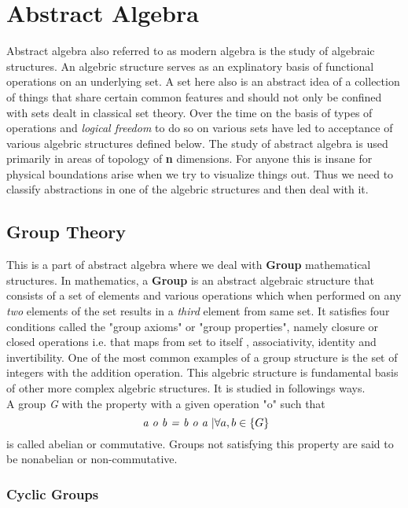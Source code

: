\chapter{Abstract Algebra }

Abstract algebra \cite{abstractmaths} also referred to as modern algebra is the study of algebraic structures. An algebric structure serves as an explinatory basis of functional operations on an underlying set. A set here also is an abstract idea of a collection of things that share certain common features and should not only be confined with sets dealt in classical set theory. Over the time on the basis of types of operations and \textit{logical freedom} to do so on various sets have led to acceptance of various algebric structures defined below. The study of abstract algebra is used primarily in areas of topology of \textbf{n} dimensions. For anyone this is insane for physical boundations arise when we try to visualize things out. Thus we need to classify abstractions in one of the algebric structures and then deal with it. 

\section{Group Theory}

This is a part of abstract algebra where we deal with \textbf{Group} mathematical structures. In mathematics, a \textbf{Group} is an abstract algebraic structure that consists of a set of elements and various operations which when performed on any \textit{two} elements of the set results in a \textit{third} element from same set. It satisfies four conditions called the "group axioms" or "group properties", namely closure or closed operations i.e. that maps from set to itself , associativity, identity and invertibility. One of the most common examples of a group structure is the set of integers with the addition operation. This algebric structure is fundamental basis of other more complex algebric structures. It is studied in followings ways.\\

A group \textit{G} with the property with a given operation "o" such that \[ \textit{ a o b = b o a }  | \hfill \forall a,b \in \{ G \} \] is called abelian or commutative. Groups not satisfying this property are said to be nonabelian or non-commutative.

\subsection{Cyclic Groups}

